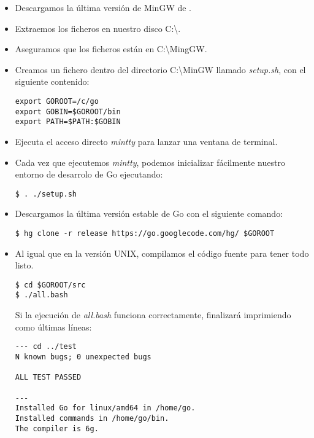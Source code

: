 	\begin{itemize}
		\item Descargamos la última versión de MinGW de \cite{MinGW}.
		\item Extraemos los ficheros en nuestro disco C:\textbackslash.
		\item Aseguramos que los ficheros están en C:\textbackslash MingGW.
		\item Creamos un fichero dentro del directorio C:\textbackslash MinGW
		llamado \emph{setup.sh}, con el siguiente contenido:

\begin{lstlisting}[numbers=none]
export GOROOT=/c/go
export GOBIN=$GOROOT/bin
export PATH=$PATH:$GOBIN
\end{lstlisting}

		\item Ejecuta el acceso directo \emph{mintty} para lanzar una ventana de
		terminal.
		\item Cada vez que ejecutemos \emph{mintty}, podemos inicializar
		fácilmente nuestro entorno de desarrolo de Go ejecutando:

\begin{lstlisting}[numbers=none]
$ . ./setup.sh
\end{lstlisting}

		\item Descargamos la última versión estable de Go con el siguiente
		comando:

\begin{lstlisting}[numbers=none]
$ hg clone -r release https://go.googlecode.com/hg/ $GOROOT
\end{lstlisting}

		\item Al igual que en la versión UNIX, compilamos el código fuente para
		tener todo listo.

\begin{lstlisting}[numbers=none]
$ cd $GOROOT/src
$ ./all.bash
\end{lstlisting}

	Si la ejecución de \emph{all.bash} funciona correctamente, finalizará
	imprimiendo como últimas líneas:

\begin{lstlisting}[numbers=none]
--- cd ../test
N known bugs; 0 unexpected bugs

ALL TEST PASSED

---
Installed Go for linux/amd64 in /home/go.
Installed commands in /home/go/bin.
The compiler is 6g.
\end{lstlisting}
	\end{itemize}


